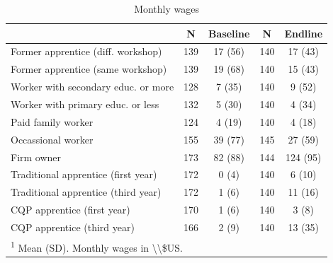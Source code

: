 \documentclass[
  11pt,
a4paper
]{article}
\begin{document}
\begin{table}

\caption{\label{tab:tbl-wages}Monthly wages}
\centering
\begin{tabular}[t]{lcccc}
\toprule
 & \textbf{N} & \textbf{Baseline} & \textbf{N} & \textbf{Endline}\\
\midrule
Former apprentice (diff. workshop) & 139 & 17 (56) & 140 & 17 (43)\\
Former apprentice (same workshop) & 139 & 19 (68) & 140 & 15 (43)\\
Worker with secondary educ. or more & 128 & 7 (35) & 140 & 9 (52)\\
Worker with primary educ. or less & 132 & 5 (30) & 140 & 4 (34)\\
Paid family worker & 124 & 4 (19) & 140 & 4 (18)\\
Occassional worker & 155 & 39 (77) & 145 & 27 (59)\\
Firm owner & 173 & 82 (88) & 144 & 124 (95)\\
Traditional apprentice (first year) & 172 & 0 (4) & 140 & 6 (10)\\
Traditional apprentice (third year) & 172 & 1 (6) & 140 & 11 (16)\\
CQP apprentice (first year) & 170 & 1 (6) & 140 & 3 (8)\\
CQP apprentice (third year) & 166 & 2 (9) & 140 & 13 (35)\\
\bottomrule
\multicolumn{5}{l}{\rule{0pt}{1em}\textsuperscript{1} Mean (SD). Monthly wages in \textbackslash{}\textbackslash{}\$US.}\\
\end{tabular}
\end{table}
\end{document}

